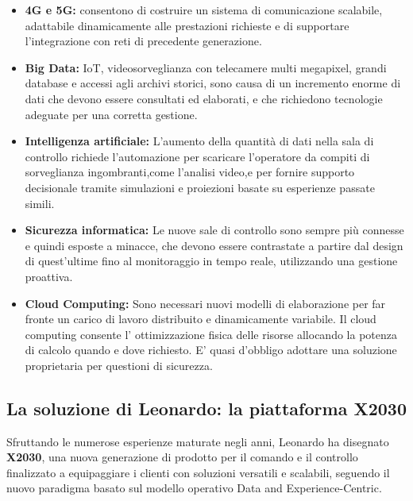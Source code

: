 \begin{itemize}
    \item \textbf{4G e 5G:} consentono di costruire un sistema di comunicazione scalabile,
    adattabile dinamicamente alle prestazioni richieste e di supportare l'integrazione con
    reti di precedente generazione.
    \item \textbf{Big Data:} IoT, videosorveglianza con telecamere multi megapixel,
    grandi database e accessi agli archivi storici, sono causa di un incremento enorme di 
    dati che devono essere consultati ed elaborati, e che richiedono
    tecnologie adeguate per una corretta gestione.
    \item \textbf{Intelligenza artificiale:} L'aumento della quantità di dati nella sala di 
    controllo richiede l'automazione per scaricare l'operatore da compiti di sorveglianza 
    ingombranti,come l'analisi video,e per fornire supporto decisionale tramite simulazioni
     e proiezioni basate su esperienze passate simili.
    \item \textbf{Sicurezza informatica:} Le nuove sale di controllo
    sono sempre più connesse e quindi esposte a minacce, che devono essere contrastate a partire 
    dal design di quest'ultime fino al monitoraggio in tempo reale, utilizzando una gestione proattiva. 
    \item \textbf{Cloud Computing:} Sono necessari nuovi modelli di elaborazione per far fronte
    un carico di lavoro distribuito e dinamicamente variabile. Il cloud computing consente l' ottimizzazione fisica
    delle risorse allocando la potenza di calcolo quando e dove richiesto.
     E' quasi d'obbligo adottare una soluzione proprietaria per questioni di sicurezza.

\end{itemize}



\subsection{La soluzione di Leonardo: la piattaforma X2030}
Sfruttando le numerose esperienze maturate negli anni,
Leonardo ha disegnato \textbf{X2030}, una nuova generazione
di prodotto per il comando e il controllo finalizzato a equipaggiare
i clienti con soluzioni versatili e scalabili, seguendo il nuovo paradigma
basato sul modello operativo Data and Experience-Centric.

